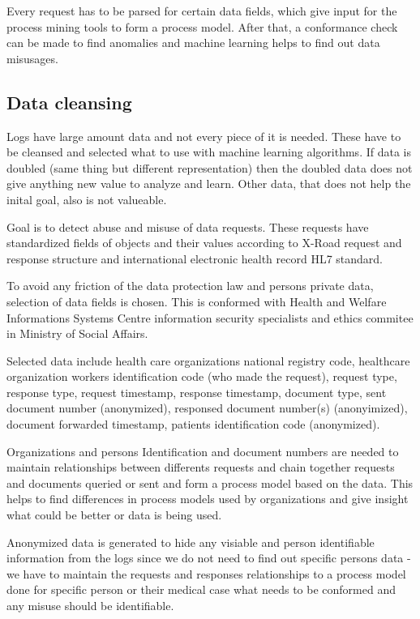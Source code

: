 \documentclass[a4paper, 12pt]{article}
\begin{document}
Every request has to be parsed for certain data fields, which give input for the process mining tools to form a process model. After that, a conformance check can be made to find anomalies and machine learning helps to find out data misusages. 

\subsection{Data cleansing}
Logs have large amount data and not every piece of it is needed. These have to be cleansed and selected what to use with machine learning algorithms. If data is doubled (same thing but different representation) then the doubled data does not give anything new value to analyze and learn. Other data, that does not help the inital goal, also is not valueable. 

Goal is to detect abuse and misuse of data requests. These requests have standardized fields of objects and their values according to X-Road request and response structure and international electronic health record HL7 standard. 

To avoid any friction of the data protection law and persons private data, selection of data fields is chosen. This is conformed with Health and Welfare Informations Systems Centre information security specialists and ethics commitee in Ministry of Social Affairs. 

Selected data include health care organizations national registry code, healthcare organization workers identification code (who made the request), request type, response type, request timestamp, response timestamp, document type, sent document number (anonymized), responsed document number(s) (anonyimized), document forwarded timestamp, patients identification code (anonymized). 

Organizations and persons Identification and document numbers are needed to maintain relationships between differents requests and chain together requests and documents queried or sent and form a process model based on the data. This helps to find differences in process models used by organizations and give insight what could be better or data is being used. 

Anonymized data is generated to hide any visiable and person identifiable information from the logs since we do not need to find out specific persons data - we have to maintain the requests and responses relationships to a process model done for specific person or their medical case what needs to be conformed and any misuse should be identifiable. 
\end{document}
